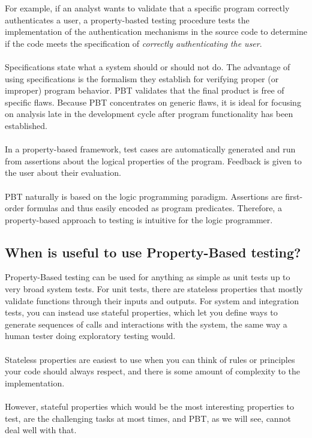 \documentclass{report}
\theoremstyle{definition}
\theoremstyle{definition}
\begin{document}
For example, if an analyst wants to validate that a specific program correctly authenticates a user, a property-basted testing procedure tests the implementation of the authentication mechanisms in the source code to determine if the code meets the specification of \textit{correctly authenticating the user}.\\\\
Specifications state what a system should or should not do. The advantage of using specifications is the formalism they establish for verifying proper (or improper) program behavior. PBT validates that the final product is free of specific flaws. Because PBT concentrates on generic flaws, it is ideal for focusing on analysis late in the development cycle after program functionality has been established.\\\\
In a property-based framework, test cases are automatically generated and run from assertions about the logical properties of the program. Feedback is given to the user about their evaluation.\\\\
PBT naturally is based on the logic programming paradigm. Assertions are first-order formulas and thus easily encoded as program predicates. Therefore, a property-based approach to testing is intuitive for the logic programmer.

\subsection*{When is useful to use Property-Based testing?}

Property-Based testing can be used for anything as simple as unit tests up to very broad system tests. For unit tests, there are stateless properties that mostly validate functions through their inputs and outputs. For system and integration tests, you can instead use stateful properties, which let you define ways to generate sequences of calls and interactions with the system, the same way a human tester doing exploratory testing would.\\\\
Stateless properties are easiest to use when you can think of rules or principles your code should always respect, and there is some amount of complexity to the implementation.\\\\
However, stateful properties which would be the most interesting properties to test, are the challenging tasks at most times, and PBT, as we will see, cannot deal well with that.
\end{document}
